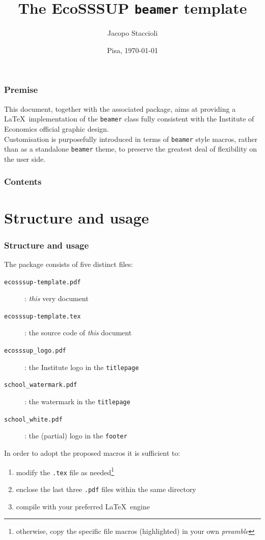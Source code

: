 \documentclass[english]{beamer}
\title[The EcoSSSUP \texttt{beamer} template]{The EcoSSSUP \texttt{beamer} template}
\author[Jacopo Staccioli]{Jacopo Staccioli}
\institute{\href{mailto:j.staccioli@santannapisa.it}{\texttt{j.staccioli<at>santannapisa.it}}}
\date[\today]{Pisa, \today}
\begin{document}
\begin{frame}
\vspace{15ex} %
\titlepage
\end{frame}

\begin{frame}
\frametitle{Premise}
This document, together with the associated package, aims at providing a \LaTeX\ implementation of the \texttt{beamer} class fully consistent with the Institute of Economics official graphic design.\\
\bigskip
Customisation is purposefully introduced in terms of \texttt{beamer} style macros, rather than as a standalone \texttt{beamer} theme, to preserve the greatest deal of flexibility on the user side.
\end{frame}

\begin{frame}
\frametitle{Contents}
\tableofcontents
\end{frame}

\section{Structure and usage}

\begin{frame}
\frametitle{Structure and usage}
The package consists of five distinct files:
\begin{description}
\item[\texttt{ecosssup-template.pdf}]: \emph{this} very document
\item[\texttt{ecosssup-template.tex}]: the source code of \emph{this} document
\item[\texttt{ecosssup\_logo.pdf}]: the Institute logo in the \texttt{titlepage}
\item[\texttt{school\_watermark.pdf}]: the watermark in the \texttt{titlepage}
\item[\texttt{school\_white.pdf}]: the (partial) logo in the \texttt{footer}
\end{description}
\bigskip
In order to adopt the proposed macros it is sufficient to:
\begin{enumerate}
\item modify the \texttt{.tex} file as needed\footnote{otherwise, copy the specific file macros (highlighted) in your own \emph{preamble}}
\item enclose the last three \texttt{.pdf} files within the same directory
\item compile with your preferred \LaTeX\ engine
\end{enumerate}
\end{frame}
\end{document}
